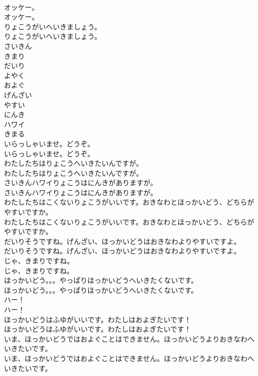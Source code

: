 \documentclass[8pt]{extreport}
\begin{document}
\begin{CJK}{UTF8}{min}
\\	オッケー。	
\\	オッケー。 
\\	りょこうがいへいきましょう。	
\\	りょこうがいへいきましょう。 
\\	さいきん
\\	きまり
\\	だいり
\\	よやく
\\	およぐ
\\	げんざい
\\	やすい
\\	にんき
\\	ハワイ
\\	きまる
\\	いらっしゃいませ。どうぞ。	
\\	いらっしゃいませ。どうぞ。 
\\	わたしたちはりょこうへいきたいんですが。	
\\	わたしたちはりょこうへいきたいんですが。 
\\	さいきんハワイりょこうはにんきがありますが。	
\\	さいきんハワイりょこうはにんきがありますが。 
\\	わたしたちはこくないりょこうがいいです。おきなわとほっかいどう、どちらがやすいですか。	
\\	わたしたちはこくないりょこうがいいです。おきなわとほっかいどう、どちらがやすいですか。 
\\	だいりそうですね。げんざい、ほっかいどうはおきなわよりやすいですよ。	
\\	だいりそうですね。げんざい、ほっかいどうはおきなわよりやすいですよ。 
\\	じゃ、きまりですね。	
\\	じゃ、きまりですね。 
\\	ほっかいどう。。。やっぱりほっかいどうへいきたくないです。	
\\	ほっかいどう。。。やっぱりほっかいどうへいきたくないです。 
\\	ハー！	
\\	ハー！ 
\\	ほっかいどうはふゆがいいです。わたしはおよぎたいです！	
\\	ほっかいどうはふゆがいいです。わたしはおよぎたいです！ 
\\	いま、ほっかいどうではおよぐことはできません。ほっかいどうよりおきなわへいきたいです。	
\\	いま、ほっかいどうではおよぐことはできません。ほっかいどうよりおきなわへいきたいです。 

\end{CJK}
\end{document}
